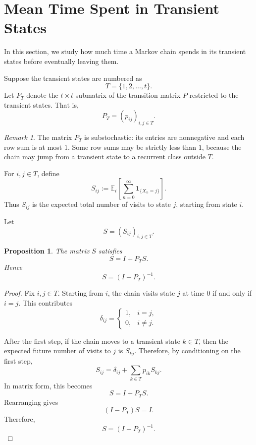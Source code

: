\documentclass[11pt]{article}
\theoremstyle{plain}
\newtheorem{proposition}[theorem]{Proposition}
\theoremstyle{definition}
\theoremstyle{remark}
\newtheorem{remark}[theorem]{Remark}
\begin{document}
	\section{Mean Time Spent in Transient States}
	
	In this section, we study how much time a Markov chain spends in its transient states before eventually leaving them.
	
	Suppose the transient states are numbered as
	\[
	T=\{1,2,\dots,t\}.
	\]
	Let \(P_T\) denote the \(t\times t\) submatrix of the transition matrix \(P\) restricted to the transient states. That is,
	\[
	P_T=(p_{ij})_{i,j\in T}.
	\]
	
	\begin{remark}
		The matrix \(P_T\) is substochastic: its entries are nonnegative and each row sum is at most \(1\). Some row sums may be strictly less than \(1\), because the chain may jump from a transient state to a recurrent class outside \(T\).
	\end{remark}
	
	For \(i,j\in T\), define
	\[
	S_{ij}:=\mathbb{E}_i\!\left[\sum_{n=0}^{\infty}\mathbf{1}_{\{X_n=j\}}\right].
	\]
	Thus \(S_{ij}\) is the expected total number of visits to state \(j\), starting from state \(i\).
	
	Let
	\[
	S=(S_{ij})_{i,j\in T}.
	\]
	
	\begin{proposition}
		The matrix \(S\) satisfies
		\[
		S=I+P_T S.
		\]
		Hence
		\[
		S=(I-P_T)^{-1}.
		\]
	\end{proposition}
	
	\begin{proof}
		Fix \(i,j\in T\). Starting from \(i\), the chain visits state \(j\) at time \(0\) if and only if \(i=j\). This contributes
		\[
		\delta_{ij}
		=
		\begin{cases}
			1, & i=j,\\
			0, & i\neq j.
		\end{cases}
		\]
		
		After the first step, if the chain moves to a transient state \(k\in T\), then the expected future number of visits to \(j\) is \(S_{kj}\). Therefore, by conditioning on the first step,
		\[
		S_{ij}
		=
		\delta_{ij}
		+
		\sum_{k\in T}p_{ik}S_{kj}.
		\]
		In matrix form, this becomes
		\[
		S=I+P_T S.
		\]
		Rearranging gives
		\[
		(I-P_T)S=I.
		\]
		Therefore,
		\[
		S=(I-P_T)^{-1}.
		\]
	\end{proof}
	
\end{document}
